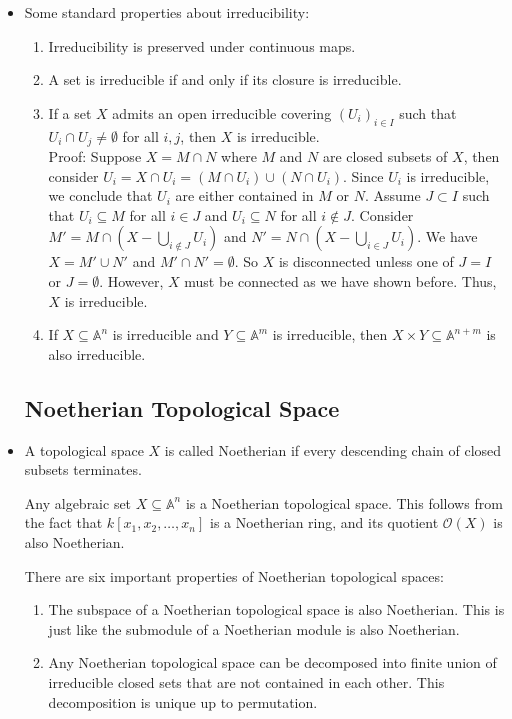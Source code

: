 \documentclass[15pt]{scrartcl}
\newcommand{\A}{\mathbb{A}}
\begin{document}
\begin{itemize}
    This is very nice! It allows us to study geometric irreducibility using algebraic tools: ideals and integral domains. With this characterization, we know all affine space $\A^n$ are irreducible just like $\A^1$. 
    \item Some standard properties about irreducibility:
    \begin{enumerate}
        \item Irreducibility is preserved under continuous maps. 
        \item A set is irreducible if and only if its closure is irreducible.
        \item If a set $X$ admits an open irreducible covering $(U_i)_{i\in I}$ such that $U_i\cap U_j\neq \emptyset$ for all $i,j$, then $X$ is irreducible. 
        \\
        Proof: Suppose $X=M\cap N$ where $M$ and $N$ are closed subsets of $X$, then consider $U_i=X\cap U_i=(M\cap U_i)\cup (N\cap U_i)$. Since $U_i$ is irreducible, we conclude that $U_i$ are either contained in $M$ or $N$. Assume $J\subset I$ such that $U_i\subseteq M$ for all $i\in J$ and $U_i\subseteq N$ for all $i\notin J$. Consider $M'=M\cap (X-\bigcup_{i\notin J} U_i)$ and $N'=N\cap (X-\bigcup_{i\in J} U_i)$. We have $X=M'\cup N'$ and $M'\cap N'=\emptyset$. So $X$ is disconnected unless one of $J=I$ or $J=\emptyset$. However, $X$ must be connected as we have shown before. Thus, $X$ is irreducible.
        \item If $X\subseteq \A^n$ is irreducible and $Y\subseteq \A^m$ is irreducible, then $X\times Y\subseteq \A^{n+m}$ is also irreducible. 
    \end{enumerate}
    \subsection{Noetherian Topological Space}
    \item A topological space $X$ is called Noetherian if every descending chain of closed subsets terminates. 
    \begin{corollary}
        Any algebraic set $X\subseteq \A^n$ is a Noetherian topological space. This follows from the fact that $k[x_1,x_2,\ldots,x_n]$ is a Noetherian ring, and its quotient $\mathcal{O}(X)$ is also Noetherian. 
    \end{corollary}
    There are six important properties of Noetherian topological spaces:
    \begin{enumerate}
    \item The subspace of a Noetherian topological space is also Noetherian. This is just like the submodule of a Noetherian module is also Noetherian. 
    \item Any Noetherian topological space can be decomposed into finite union of irreducible closed sets that are not contained in each other. This decomposition is unique up to permutation. 
    \\


\end{enumerate}
\end{itemize}
\end{document}
